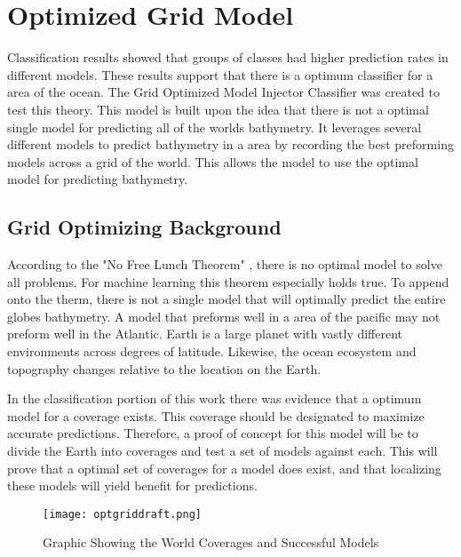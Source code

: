 \section{Optimized Grid Model}
\setlength{\parindent}{10ex}
Classification results showed that groups of classes had higher prediction rates in different models.
These results support that there is a optimum classifier for a area of the ocean.
The Grid Optimized Model Injector Classifier was created to test this theory.
This model is built upon the idea that there is not a optimal single model for predicting all of the worlds bathymetry.
It leverages several different models to predict bathymetry in a area by recording the best preforming models across a grid of the world.
This allows the model to use the optimal model for predicting bathymetry.

\subsection{Grid Optimizing Background}
According to the "No Free Lunch Theorem" \cite{wolpert1997no}, there is no optimal model to solve all problems.
For machine learning this theorem especially holds true.
To append onto the therm, there is not a single model that will optimally predict the entire globes bathymetry.
A model that preforms well in a area of the pacific may not preform well in the Atlantic.
Earth is a large planet with vastly different environments across degrees of latitude.
Likewise, the ocean ecosystem and topography changes relative to the location on the Earth.

\par
In the classification portion of this work there was evidence that a optimum model for a coverage exists.
This coverage should be designated to maximize accurate predictions.
Therefore, a proof of concept for this model will be to divide the Earth into coverages and test a set of models against each.
This will prove that a optimal set of coverages for a model does exist, and that localizing these models will yield benefit for predictions.

\begin{figure}[h]
    \centering
    \texttt{[image: optgriddraft.png]}
    \caption{Graphic Showing the World Coverages and Successful Models}
    \label{fig:coveragegrid}
\end{figure}

